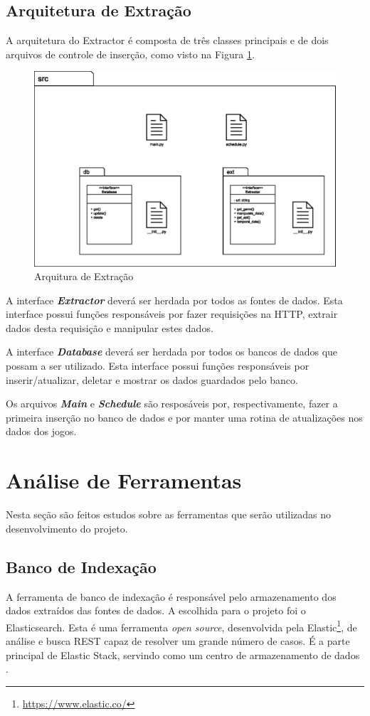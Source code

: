 \subsection{Arquitetura de Extração}
A arquitetura do Extractor é composta de três classes principais e de dois arquivos de controle de inserção, como visto na Figura \ref{image:extractor}.
\begin{figure} [H]
\centering
\includegraphics[scale=0.5]{figuras/arquiteturaExtractor.eps}
\caption{Arquitura de Extração}
\label{image:extractor}
\end{figure}
A interface \textit{\textbf{Extractor}} deverá ser herdada por todos as fontes de dados. Esta interface possui funções responsáveis por fazer requisições na HTTP, extrair dados desta requisição e manipular estes dados.

A interface \textit{\textbf{Database}} deverá ser herdada por todos os bancos de dados que possam a ser utilizado. Esta interface possui funções responsáveis por inserir/atualizar, deletar e mostrar os dados guardados pelo banco.

Os arquivos \textit{\textbf{Main}} e \textit{\textbf{Schedule}} são resposáveis por, respectivamente, fazer a primeira inserção no banco de dados e por manter uma rotina de atualizações nos dados dos jogos.

\section{Análise de Ferramentas}
Nesta seção são feitos estudos sobre as ferramentas que serão utilizadas no desenvolvimento do projeto.
\subsection{Banco de Indexação}
A ferramenta de banco de indexação é responsável pelo armazenamento dos dados extraídos das fontes de dados. A escolhida para o projeto foi o Elasticsearch. Esta é uma ferramenta \textit{open source}, desenvolvida pela Elastic\footnote[1]{\url{https://www.elastic.co/}}, de análise e busca REST capaz de resolver um grande número de casos. É a parte principal de Elastic Stack, servindo como um centro de armazenamento de dados \cite{elasticsearch}.

